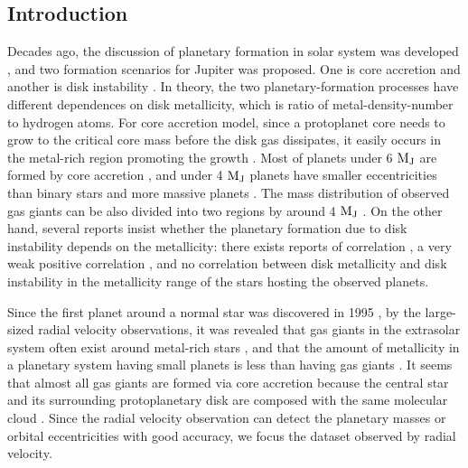 \documentclass[twocolumn, dvipdfmx]{aastex62}
\begin{document}
\begin{CJK*}{UTF8}{min}
\begin{abstract}
\end{abstract}

\vspace{1cm}



\section{Introduction} \label{sec:introduction}

Decades ago, the discussion of planetary formation in solar system was developed \citep{1985prpl.conf.1100H}, and two formation scenarios for Jupiter was proposed. One is core accretion \citep{1974Icar...22..416P, 1980PThPh..64..544M, 1996Icar..124...62P} and another is disk instability \citep{1951PNAS...37....1K, 1997Sci...276.1836B, 2002Sci...298.1756M}. In theory, the two planetary-formation processes have different dependences on disk metallicity, which is ratio of metal-density-number to hydrogen atoms. For core accretion model, since a protoplanet core needs to grow to the critical core mass before the disk gas dissipates, it easily occurs in the metal-rich region promoting the growth \citep{2004ApJ...616..567I, 2012A&A...541A..97M}. Most of planets under 6 $\rm M_J$ are formed by core accretion \citep{2007ApJ...662.1282M}, and under 4 $\rm M_J$ planets have smaller eccentricities than binary stars and more massive planets \citep{2007A&A...464..779R}. The mass distribution of observed gas giants can be also divided into two regions by around 4 $\rm M_J$ \citep{2017A&A...603A..30S}. On the other hand, several reports insist whether the planetary formation due to disk instability depends on the metallicity: there exists reports of correlation \citep{2006ApJ...636L.149C, 2007Arizona}, a very weak positive correlation \citep{2007ApJ...661L..77M}, and no correlation \citep{2002ApJ...567L.149B} between disk metallicity and disk instability in the metallicity range of the stars hosting the observed planets. 

Since the first planet around a normal star was discovered in 1995
\citep{1995Natur.378..355M}, by the large-sized radial velocity observations, it was revealed that gas giants in the extrasolar system often exist around metal-rich stars \citep{2003A&A...398..363S, 2005ApJ...622.1102F}, and that the amount of metallicity in a planetary system having small planets is less than having gas giants \citep{2011arXiv1109.2497M, 2015AJ....149...14W}. It seems that almost all gas giants are formed via core accretion because the central star and its surrounding protoplanetary disk are composed with the same molecular cloud \citep{2004ApJ...616..567I, 2012A&A...541A..97M}. Since the radial velocity observation can detect the planetary masses or orbital eccentricities with good accuracy, we focus the dataset observed by radial velocity.


\end{CJK*}
\end{document}
